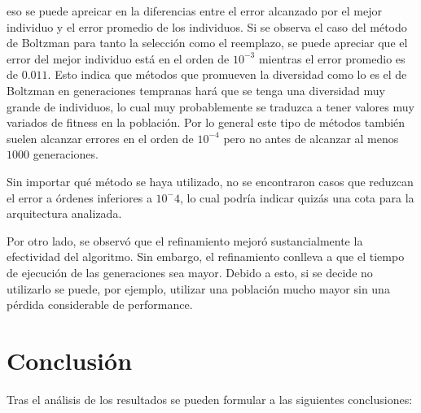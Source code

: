 \documentclass[%
    final,
    reprint,
    notitlepage,
    narroweqnarray,
    inline,
    twoside,
    invited
    ]{ieee}
\begin{document}
eso se puede apreicar en la diferencias entre el error alcanzado por el mejor individuo y el error promedio 
de los individuos. Si se observa el caso del método de Boltzman para tanto la selección como el reemplazo, 
se puede apreciar que el error del mejor individuo está en el orden de $10^{-3}$ mientras el error promedio 
es de $0.011$. Esto indica que métodos que promueven la diversidad como lo es el de Boltzman en generaciones 
tempranas hará que se tenga una diversidad muy grande de individuos, lo cual muy probablemente se traduzca a 
tener valores muy variados de fitness en la población. Por lo general este tipo de métodos también suelen alcanzar 
errores en el orden de $10^{-4}$ pero no antes de alcanzar al menos $1000$ generaciones. 
\par Sin importar qué método se haya utilizado, no se encontraron casos que reduzcan el error a órdenes 
inferiores a $10^-4$, lo cual podría indicar quizás una cota para la arquitectura analizada.
\par Por otro lado, se observó que el refinamiento mejoró sustancialmente la efectividad del algoritmo. Sin embargo, 
el refinamiento conlleva a que el tiempo de ejecución de las generaciones sea mayor. Debido a esto, 
si se decide no utilizarlo se puede, por ejemplo, utilizar una población mucho mayor sin una pérdida considerable 
de performance. 

\section{Conclusión}

Tras el análisis de los resultados se pueden formular a las siguientes conclusiones:
\end{document}

